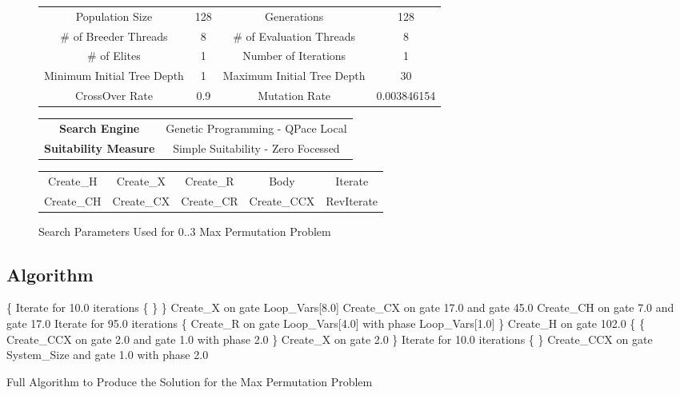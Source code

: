 \begin{figure}[h!]
\begin{center}
 \begin{tabular}{|cc|cc|}
\hline
  Population Size & 128 & Generations & 128 \\
  \# of Breeder Threads & 8 & \# of Evaluation Threads & 8 \\
  \# of Elites & 1 & Number of Iterations & 1 \\
  Minimum Initial Tree Depth & 1 & Maximum Initial Tree Depth & 30 \\
  CrossOver Rate & 0.9 & Mutation Rate & 0.003846154 \\
\hline
 \end{tabular}
 \begin{tabular}{cc}
  \textbf{Search Engine} & Genetic Programming - QPace Local \\
  \textbf{Suitability Measure} & Simple Suitability - Zero Focessed \\
 \end{tabular}
 \begin{tabular}{|ccccc|}
\hline
  Create\_H & Create\_X & Create\_R & Body & Iterate \\
  Create\_CH & Create\_CX & Create\_CR & Create\_CCX & RevIterate \\
\hline
 \end{tabular}
\end{center}
\caption{Search Parameters Used for 0..3 Max Permutation Problem}
\label{fig:maxpermparams}
\end{figure}

\clearpage
\subsection{Algorithm}
\begin{algorithm}
 \begin{algorithmic}
\STATE \{
\STATE Iterate for 10.0 iterations \{
\STATE \}
\STATE \}
\STATE Create\_X on gate Loop\_Vars[8.0]
\STATE Create\_CX on gate 17.0 and gate 45.0
\STATE Create\_CH on gate 7.0 and gate 17.0
\STATE Iterate for 95.0 iterations \{
\STATE Create\_R on gate Loop\_Vars[4.0] with phase Loop\_Vars[1.0]
\STATE \}
\STATE Create\_H on gate 102.0
\STATE \{
\STATE \{
\STATE Create\_CCX on gate 2.0 and gate 1.0 with phase 2.0
\STATE \}
\STATE Create\_X on gate 2.0
\STATE \}
\STATE Iterate for 10.0 iterations \{
\STATE \}
\STATE Create\_CCX on gate System\_Size and gate 1.0 with phase 2.0
\end{algorithmic}
\caption{Full Algorithm to Produce the Solution for the Max Permutation Problem}
\label{alg:03permfullalg}
\end{algorithm}

